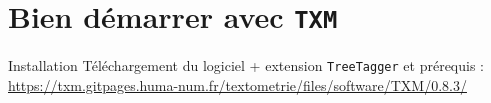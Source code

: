 \documentclass[xetex,xcolor={table,usenames,dvipsnames}]{beamer}
\begin{document}
\section{Bien démarrer avec \texttt{TXM}}

\begin{frame}{Installation}
	Téléchargement du logiciel + extension \texttt{TreeTagger} et prérequis :\\ \url{https://txm.gitpages.huma-num.fr/textometrie/files/software/TXM/0.8.3/}
\end{frame}

\begin{frame}[allowframebreaks]
		\printbibliography
\end{frame}
\end{document}
